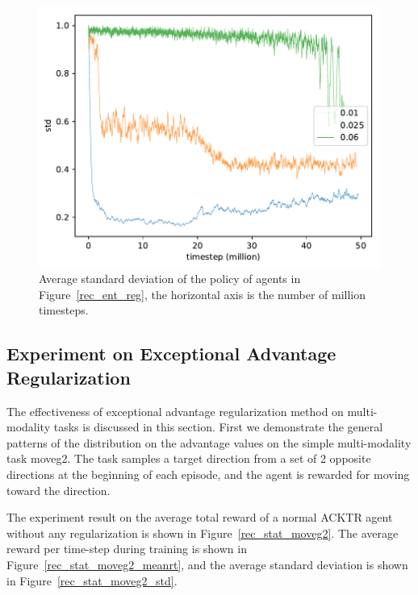 \begin{figure}[!htbp]
	\includegraphics[width=\textwidth]{images/rec_180609_std_ent_reg.pdf}
	\centering
	\caption{Average standard deviation of the policy of agents in Figure~\ref{rec_ent_reg}, the horizontal axis is the number of million timesteps.}\label{rec_std_ent_reg}
\end{figure}

\subsection{Experiment on Exceptional Advantage Regularization}\label{sec_exp_adv_reg}
The effectiveness of exceptional advantage regularization method on multi-modality tasks is discussed in this section.
First we demonstrate the general patterns of the distribution on the advantage values on the simple multi-modality task moveg2. The task samples a target direction from a set of 2 opposite directions at the beginning of each episode, and the agent is rewarded for moving toward the direction.

The experiment result on the average total reward of a normal ACKTR agent without any regularization is shown in Figure~\ref{rec_stat_moveg2}. The average reward per time-step during training is shown in Figure~\ref{rec_stat_moveg2_meanrt}, and the average standard deviation is shown in Figure~\ref{rec_stat_moveg2_std}.


